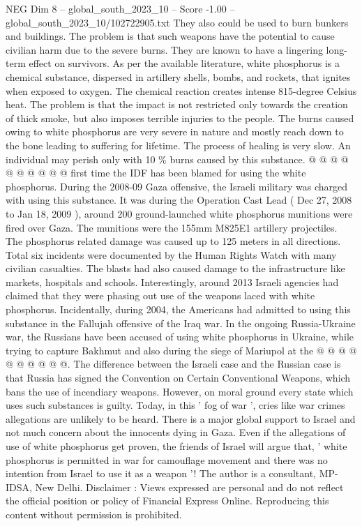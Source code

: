 \begin{textsample}{NEG Dim 8 – global\_south\_2023\_10 – Score -1.00 – global\_south\_2023\_10/102722905.txt}
They also could be used to burn bunkers and buildings.
The problem is that such weapons have the potential to cause civilian harm due to the severe burns.
They are known to have a lingering long-term effect on survivors.
As per the available literature, white phosphorus is a chemical substance, dispersed in artillery shells, bombs, and rockets, that ignites when exposed to oxygen.
The chemical reaction creates intense 815-degree Celsius heat.
The problem is that the impact is not restricted only towards the creation of thick smoke, but also imposes terrible injuries to the people.
The burns caused owing to white phosphorus are very severe in nature and mostly reach down to the bone leading to suffering for lifetime.
The process of healing is very slow.
An individual may perish only with 10 \% burns caused by this substance. @ @ @ @ @ @ @ @ @ @ first time the IDF has been blamed for using the white phosphorus.
During the 2008-09 Gaza offensive, the Israeli military was charged with using this substance.
It was during the Operation Cast Lead ( Dec 27, 2008 to Jan 18, 2009 ), around 200 ground-launched white phosphorus munitions were fired over Gaza.
The munitions were the 155mm M825E1 artillery projectiles.
The phosphorus related damage was caused up to 125 meters in all directions.
Total six incidents were documented by the Human Rights Watch with many civilian casualties.
The blasts had also caused damage to the infrastructure like markets, hospitals and schools.
Interestingly, around 2013 Israeli agencies had claimed that they were phasing out use of the weapons laced with white phosphorus.
Incidentally, during 2004, the Americans had admitted to using this substance in the Fallujah offensive of the Iraq war.
In the ongoing Russia-Ukraine war, the Russians have been accused of using white phosphorus in Ukraine, while trying to capture Bakhmut and also during the siege of Mariupol at the @ @ @ @ @ @ @ @ @ @.
The difference between the Israeli case and the Russian case is that Russia has signed the Convention on Certain Conventional Weapons, which bans the use of incendiary weapons.
However, on moral ground every state which uses such substances is guilty.
Today, in this ' fog of war ', cries like war crimes allegations are unlikely to be heard.
There is a major global support to Israel and not much concern about the innocents dying in Gaza.
Even if the allegations of use of white phosphorus get proven, the friends of Israel will argue that, ' white phosphorus is permitted in war for camouflage movement and there was no intention from Israel to use it as a weapon '!
The author is a consultant, MP-IDSA, New Delhi.
Disclaimer : Views expressed are personal and do not reflect the official position or policy of Financial Express Online.
Reproducing this content without permission is prohibited.

\end{textsample}
